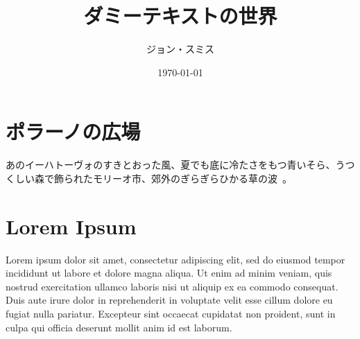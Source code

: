 \documentclass[twocolumn]{jlreq}
\begin{document}
\title{ダミーテキストの世界}
\author{ジョン・スミス}
\date{\today}
\maketitle

\section{ポラーノの広場}

あのイーハトーヴォのすきとおった風、夏でも底に冷たさをもつ青いそら、うつくしい森で飾られたモリーオ市、郊外のぎらぎらひかる草の波~\cite{miyazawa1934polano}。

\section{Lorem Ipsum}

Lorem ipsum dolor sit amet, consectetur adipiscing elit, sed do eiusmod tempor incididunt ut labore et dolore magna aliqua.
Ut enim ad minim veniam, quis nostrud exercitation ullamco laboris nisi ut aliquip ex ea commodo consequat.
Duis aute irure dolor in reprehenderit in voluptate velit esse cillum dolore eu fugiat nulla pariatur.
Excepteur sint occaecat cupidatat non proident, sunt in culpa qui officia deserunt mollit anim id est laborum.



\end{document}
